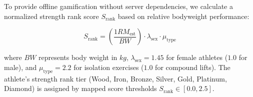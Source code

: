 To provide offline gamification without server dependencies, we calculate a normalized strength rank score $S_{\text{rank}}$ based on relative bodyweight performance:

\begin{equation}
    S_{\text{rank}} = \left( \frac{1RM_{\text{est}}}{BW} \right) \cdot \lambda_{\text{sex}} \cdot \mu_{\text{type}}
\end{equation}

where $BW$ represents body weight in $kg$, $\lambda_{\text{sex}} = 1.45$ for female athletes ($1.0$ for male), and $\mu_{\text{type}} = 2.2$ for isolation exercises ($1.0$ for compound lifts). The athlete's strength rank tier (Wood, Iron, Bronze, Silver, Gold, Platinum, Diamond) is assigned by mapped score thresholds $S_{\text{rank}} \in [0.0, 2.5]$.


